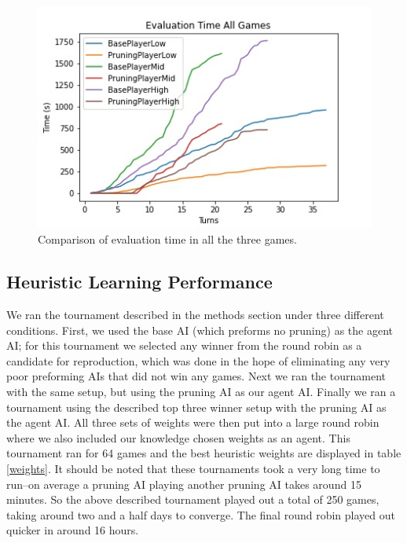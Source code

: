 \documentclass[letterpaper]{article}
\begin{document}
\begin{figure}
    \center

    \includegraphics[scale = 0.4]{all_game_time.jpg}
    
  
    \caption{Comparison of evaluation time in all the three games.}
    \label{timeEval}
\end{figure}



\subsection{Heuristic Learning Performance}
We ran the tournament described in the methods section under three different conditions.  First, we used the base AI (which preforms no pruning) as the agent AI; for this tournament we selected any winner from the round robin as a candidate for reproduction, which was done in the hope of eliminating any very poor preforming AIs that did not win any games. Next we ran the tournament with the same setup, but using the pruning AI as our agent AI. Finally we ran a tournament using the described top three winner setup with the pruning AI as the agent AI. All three sets of weights were then put into a large round robin where we also included our knowledge chosen weights as an agent. This tournament ran for 64 games and the best heuristic weights are displayed in table \ref{weights}. It should be noted that these tournaments took a very long time to run--on average a pruning AI playing another pruning AI takes around 15 minutes. So the above described tournament played out a total of 250 games, taking around two and a half days to converge. The final round robin played out quicker in around 16 hours.

\begin{table}[t]
    \centering
    \caption{Learned Heuristic Weights}
    \label{weights}
\end{table}
\end{document}
